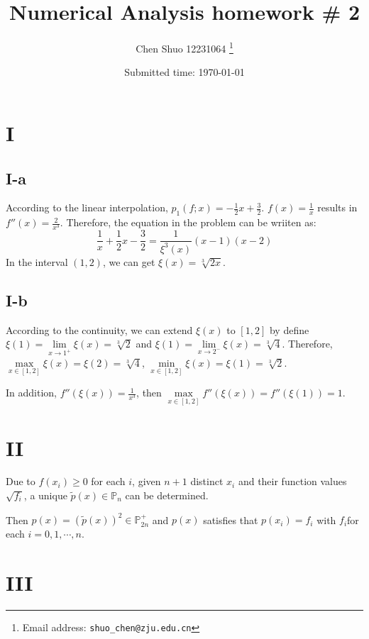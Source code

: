 \documentclass[a4paper]{article}
\begin{document}
\title{Numerical Analysis homework \# 2}

\author{Chen Shuo 12231064
  \thanks{Email address: \texttt{shuo\_chen@zju.edu.cn}}}


\date{Submitted time: \today}

\maketitle
\section*{I}

\subsection*{I-a}
According to the linear interpolation, $p_1(f;x) = -\frac{1}{2}x + \frac{3}{2}$. $f(x) = \frac{1}{x}$ results in $f''(x) = \frac{2}{x^3}$. Therefore, the equation in the problem can be wriiten as:
$$
\frac{1}{x} + \frac{1}{2}x - \frac{3}{2} = \frac{1}{\xi^3(x)}(x-1)(x-2)
$$
In the interval $(1,2)$, we can get $\xi(x) = \sqrt[3]{2x}$.

\subsection*{I-b}
According to the continuity, we can extend $\xi(x)$ to $[1,2]$ by define $\xi(1) = \lim\limits_{x\rightarrow 1^+}\xi(x) = \sqrt[3]{2}$ and $\xi(1) = \lim\limits_{x\rightarrow 2^-}\xi(x) = \sqrt[3]{4}$. 
Therefore, $\max\limits_{x\in[1,2]}\xi(x) = \xi(2) = \sqrt[3]{4}$, $\min\limits_{x\in[1,2]}\xi(x) = \xi(1) = \sqrt[3]{2}$.

In addition, $f''(\xi(x)) = \frac{1}{x^3}$, then $\max\limits_{x\in[1,2]} f''(\xi(x)) = f''(\xi(1)) = 1$.
\section*{II}
Due to $f(x_i) \geq 0$ for each $i$, given $n+1$ distinct $x_i$ and their function values $\sqrt{f_i}$, a unique $\tilde{p}(x) \in \mathbb{P}_n $ can be determined. 

Then $p(x) = (\tilde{p}(x))^2 \in \mathbb{P}_{2n}^+$ and $p(x)$ satisfies that $p(x_i) = f_i$ with $f_i$for each $i = 0,1,\cdots,n$.

\section*{III}
\end{document}
